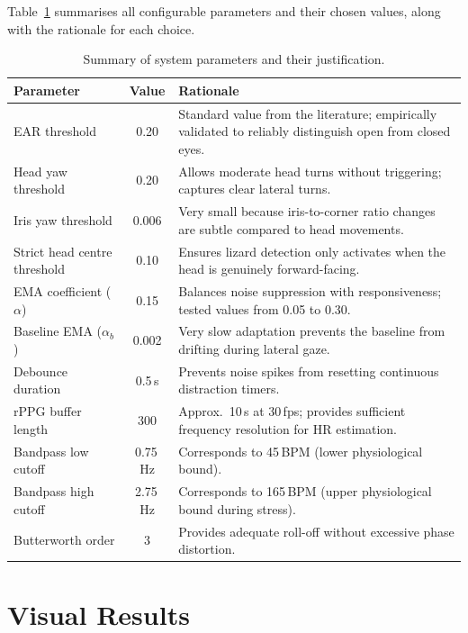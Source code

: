 \documentclass[12pt,a4paper]{article}
\begin{document}
Table~\ref{tab:params} summarises all configurable parameters and their chosen values, along with the rationale for each choice.

\begin{table}[H]
\centering
\caption{Summary of system parameters and their justification.}
\label{tab:params}
\small
\begin{tabularx}{\textwidth}{l c X}
\toprule
\textbf{Parameter} & \textbf{Value} & \textbf{Rationale} \\
\midrule
EAR threshold & 0.20 & Standard value from the literature; empirically validated to reliably distinguish open from closed eyes. \\
Head yaw threshold & 0.20 & Allows moderate head turns without triggering; captures clear lateral turns. \\
Iris yaw threshold & 0.006 & Very small because iris-to-corner ratio changes are subtle compared to head movements. \\
Strict head centre threshold & 0.10 & Ensures lizard detection only activates when the head is genuinely forward-facing. \\
EMA coefficient ($\alpha$) & 0.15 & Balances noise suppression with responsiveness; tested values from 0.05 to 0.30. \\
Baseline EMA ($\alpha_b$) & 0.002 & Very slow adaptation prevents the baseline from drifting during lateral gaze. \\
Debounce duration & 0.5\,s & Prevents noise spikes from resetting continuous distraction timers. \\
rPPG buffer length & 300 & Approx.\ 10\,s at 30\,fps; provides sufficient frequency resolution for HR estimation. \\
Bandpass low cutoff & 0.75\,Hz & Corresponds to 45\,BPM (lower physiological bound). \\
Bandpass high cutoff & 2.75\,Hz & Corresponds to 165\,BPM (upper physiological bound during stress). \\
Butterworth order & 3 & Provides adequate roll-off without excessive phase distortion. \\
\bottomrule
\end{tabularx}
\end{table}

\section{Visual Results}\label{sec:results}
\end{document}
